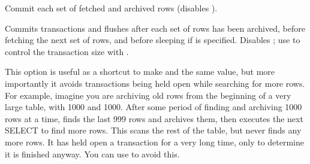 \documentclass[letterpaper,10pt,english]{sphinxmanual}
\begin{document}
\begin{fulllineitems}
\label{\detokenize{mariadb-archiver:cmdoption-mariadb-archiver-commit-each}}
Commit each set of fetched and archived rows (disables {\hyperref[\detokenize{mariadb-archiver:cmdoption-mariadb-archiver-txn-size}]{}}).

Commits transactions and flushes {\hyperref[\detokenize{mariadb-archiver:cmdoption-mariadb-archiver-file}]{}} after each set of rows has been
archived, before fetching the next set of rows, and before sleeping if
{\hyperref[\detokenize{mariadb-archiver:cmdoption-mariadb-archiver-sleep}]{}} is specified.  Disables {\hyperref[\detokenize{mariadb-archiver:cmdoption-mariadb-archiver-txn-size}]{}}; use {\hyperref[\detokenize{mariadb-archiver:cmdoption-mariadb-archiver-limit}]{}} to
control the transaction size with {\hyperref[\detokenize{mariadb-archiver:cmdoption-mariadb-archiver-commit-each}]{}}.

This option is useful as a shortcut to make {\hyperref[\detokenize{mariadb-archiver:cmdoption-mariadb-archiver-limit}]{}} and {\hyperref[\detokenize{mariadb-archiver:cmdoption-mariadb-archiver-txn-size}]{}} the
same value, but more importantly it avoids transactions being held open while
searching for more rows.  For example, imagine you are archiving old rows from
the beginning of a very large table, with {\hyperref[\detokenize{mariadb-archiver:cmdoption-mariadb-archiver-limit}]{}} 1000 and {\hyperref[\detokenize{mariadb-archiver:cmdoption-mariadb-archiver-txn-size}]{}}
1000.  After some period of finding and archiving 1000 rows at a time,
 finds the last 999 rows and archives them, then executes the next
SELECT to find more rows.  This scans the rest of the table, but never finds any
more rows.  It has held open a transaction for a very long time, only to
determine it is finished anyway.  You can use {\hyperref[\detokenize{mariadb-archiver:cmdoption-mariadb-archiver-commit-each}]{}} to avoid this.

\end{fulllineitems}
\end{document}

